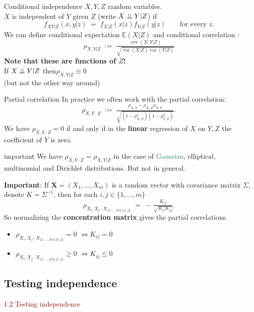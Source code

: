 \documentclass[dvipsnames,aspectratio=169]{beamer} %
\DeclareMathOperator{\cov}{cov}
\DeclareMathOperator{\var}{var}
\newcommand{\E}{\mathbb{E}}
\newcommand{\bs}{\boldsymbol}
\newcommand{\indep}{\mbox{\,$\perp\!\!\!\perp$\,}}
\begin{document}
\begin{frame}{Conditional independence}
	$X,Y,Z$ random variables.\\[.3cm]
	\alert{$X$ is independent of $Y$ given $Z$} (write \textcolor{SeaGreen}{$X\indep Y|Z$}) if
	$$
	f_{XY|Z}(x,y|z)\;=\;f_{X|Z}(x|z)f_{Y|Z}(y|z)\qquad\mbox{for every }z.
	$$
	We can define conditional expectation $\E(X|Z)$ and \alert{conditional correlation} :$$
	\rho_{X,Y| Z}\;:=\;\tfrac{\cov(X,Y|Z)}{\sqrt{\var(X|Z)\var(Y|Z)}}
	$$
	\textbf{Note that these are functions of $Z$!}\\[.3cm]
	
	If $X\indep Y|Z$ \quad then\quad  $\rho_{X,Y| Z}\equiv 0$\\
	\footnotesize{(but not the other way around)}
\end{frame}

\begin{frame}{Partial correlation}
In practice we often work with the partial correlation:
	$$
	\rho_{X,Y\cdot Z}\;:=\;\tfrac{\rho_{X,Y}-\rho_{X,Z}\rho_{X,Y}}{\sqrt{(1-\rho_{X,Z}^2)(1-\rho_{Y,Z}^2)}}.
	$$
	We have $\rho_{X,Y\cdot Z}=0$ if and only if in the \textbf{linear} regression of $X$ on $Y,Z$ the coefficient of $Y$ is zero.
	\begin{beamercolorbox}[wd=\paperwidth,sep=5pt]{important}	
		We have $\rho_{X,Y\cdot Z}=\rho_{X,Y|Z}$ in the case of \textcolor{SeaGreen}{Gaussian}, elliptical, multinomial and Dirichlet distributions. But not in general.
	\end{beamercolorbox}

	\textbf{Important}: If  $\bs X=(X_1,\ldots,X_m)$ is a random vector with covariance matrix $\Sigma$, denote $K=\Sigma^{-1}$, then for each $i,j\in \{1,\ldots,m\}$ 
	$$
	\rho_{X_i,X_j\cdot X_{\{1,\ldots,m\}\setminus \{i,j\}}}\;=\;-\tfrac{K_{ij}}{\sqrt{K_{ii}K_{jj}}}.
	$$ 
	So normalizing the \textbf{concentration matrix} gives the partial correlations.
	\begin{itemize}
		\item $\rho_{X_i,X_j\cdot X_{\{1,\ldots,m\}\setminus \{i,j\}}}=0$ \quad$\Longleftrightarrow$\quad $K_{ij}=0$
		\item $\rho_{X_i,X_j\cdot X_{\{1,\ldots,m\}\setminus \{i,j\}}}\geq 0$ \quad$\Longleftrightarrow$\quad $K_{ij}\leq 0$
	\end{itemize} 
\end{frame}


\subsection{Testing independence}
\begin{frame}{}
\begin{center}
	{\huge \textcolor{DarkRed}{1.2 Testing independence}}
\end{center}
\end{frame}
\end{document}
